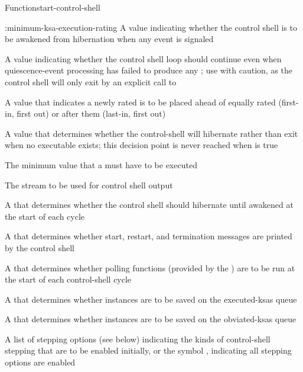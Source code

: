 \documentclass[10pt,twoside,english,pdftex]{article}
\begin{document}
\begin{functiondoc}{Function}{start-control-shell}
\begin{keywords}{:minimum-ksa-execution-rating}
   A  value indicating
  whether the control shell is to be awakened from hibernation when any event
  is signaled

   A  value
  indicating whether the control shell loop should continue even when
  quiescence-event processing has failed to produce any
  ; use with caution, as the control shell will only
  exit by an explicit call to \textbf{}

   A  value that
  indicates a newly rated  is to be placed ahead of equally
  rated  (first-in, first out) or after them (last-in, first out)

   A  value that
  determines whether the control-shell will hibernate rather than exit
  when no executable  exists; this decision point is never reached when
   is true

   The minimum  value
  that a  must have to be executed

   The stream to be used for control shell 
  output

  \keyword[:pause] A  that determines
  whether the control shell should hibernate until awakened at the
  start of each cycle

  \keyword[:print] A  that determines
  whether start, restart, and termination messages are printed by the
  control shell 

   A  that
  determines whether polling functions (provided by the
  )
  are to be run at the start of each control-shell cycle

   A  that determines
  whether  instances are to be saved on the executed-ksas
  queue

   A  that determines
  whether  instances are to be saved on the obviated-ksas
  queue

  \keyword[:stepping] A list of stepping options (see below) indicating the
  kinds of control-shell stepping that are to be enabled initially, or the
  symbol , indicating all stepping options are enabled


\end{keywords}
\end{functiondoc}
\end{document}
